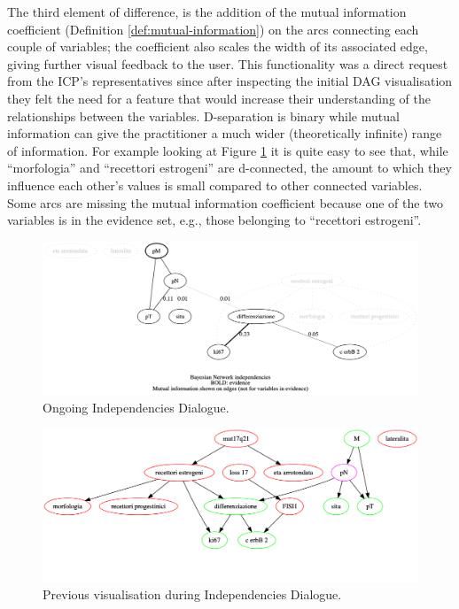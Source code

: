 The third element of difference, is the addition of the mutual information coefficient (Definition \ref{def:mutual-information}) on the arcs connecting each couple of variables; the coefficient also scales the width of its associated edge, giving further visual feedback to the user.
This functionality was a direct request from the ICP's representatives since after inspecting the initial DAG visualisation they felt the need for a feature that would increase their understanding of the relationships between the variables.
D-separation is binary while mutual information can give the practitioner a much wider (theoretically infinite) range of information.
For example looking at Figure \ref{fig:independencies_dialogue_output} it is quite easy to see that, while \enquote{morfologia} and \enquote{recettori estrogeni} are d-connected, the amount to which they influence each other's values is small compared to other connected variables.
Some arcs are missing the mutual information coefficient because one of the two variables is in the evidence set, e.g., those belonging to \enquote{recettori estrogeni}.

\begin{figure}[htbp]
\centerline{\includegraphics[width=\textwidth]{results/images/independencies_dialogue_output}}
\caption{Ongoing Independencies Dialogue.}
\label{fig:independencies_dialogue_output}
\end{figure}

\begin{figure}[htbp]
\centerline{\includegraphics[width=\textwidth]{results/images/independencies_dialogue_output_old}}
\caption{Previous visualisation during Independencies Dialogue.}
\label{fig:independencies_dialogue_output_old}
\end{figure}

